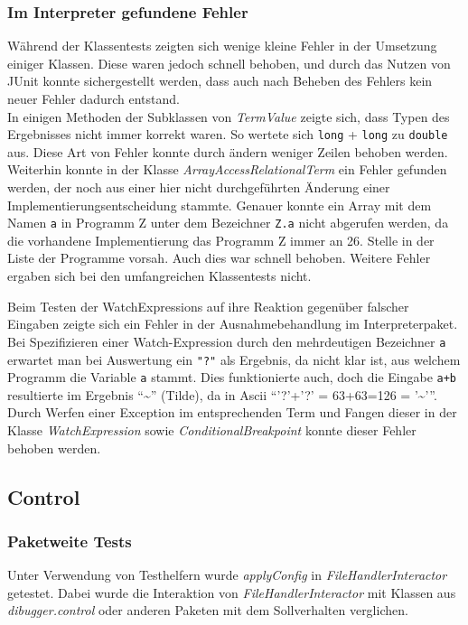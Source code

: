 \documentclass[parskip=full]{scrartcl}
\begin{document}
\subsubsection{Im Interpreter gefundene Fehler}
Während der Klassentests zeigten sich wenige kleine Fehler in der Umsetzung einiger Klassen. Diese waren jedoch schnell behoben, und durch das Nutzen von JUnit konnte sichergestellt werden, dass auch nach Beheben des Fehlers kein neuer Fehler dadurch entstand.\\
In einigen Methoden der Subklassen von \textit{TermValue} zeigte sich, dass Typen des Ergebnisses nicht immer korrekt waren. So wertete sich \texttt{long} + \texttt{long} zu \texttt{double} aus. Diese Art von Fehler konnte durch ändern weniger Zeilen behoben werden.\\
Weiterhin konnte in der Klasse \textit{ArrayAccessRelationalTerm} ein Fehler gefunden werden, der noch aus einer hier nicht durchgeführten Änderung einer Implementierungsentscheidung stammte. Genauer konnte ein Array mit dem Namen \texttt{a} in Programm Z unter dem Bezeichner \texttt{Z.a} nicht abgerufen werden, da die vorhandene Implementierung das Programm Z immer an 26. Stelle in der Liste der Programme vorsah. Auch dies war schnell behoben. Weitere Fehler ergaben sich bei den umfangreichen Klassentests nicht.

Beim Testen der WatchExpressions auf ihre Reaktion gegenüber falscher Eingaben zeigte sich ein Fehler in der Ausnahmebehandlung im Interpreterpaket. Bei Spezifizieren einer Watch-Expression durch den mehrdeutigen Bezeichner \texttt{a} erwartet man bei Auswertung ein \texttt{"?"} als Ergebnis, da nicht klar ist, aus welchem Programm die Variable \texttt{a} stammt. Dies funktionierte auch, doch die Eingabe \texttt{a+b} resultierte im Ergebnis \enquote{\~{}} (Tilde), da in Ascii \enquote{'?'+'?' = 63+63=126 = '\~{}'}.
Durch Werfen einer Exception im entsprechenden Term und Fangen dieser in der Klasse \textit{WatchExpression} sowie \textit{ConditionalBreakpoint} konnte dieser Fehler behoben werden.

\subsection{Control}
\subsubsection{Paketweite Tests}
Unter Verwendung von Testhelfern wurde \textit{applyConfig} in \textit{FileHandlerInteractor} getestet.
Dabei wurde die Interaktion von \textit{FileHandlerInteractor} mit Klassen aus \textit{dibugger.control} oder anderen Paketen mit dem Sollverhalten verglichen.
\end{document}

